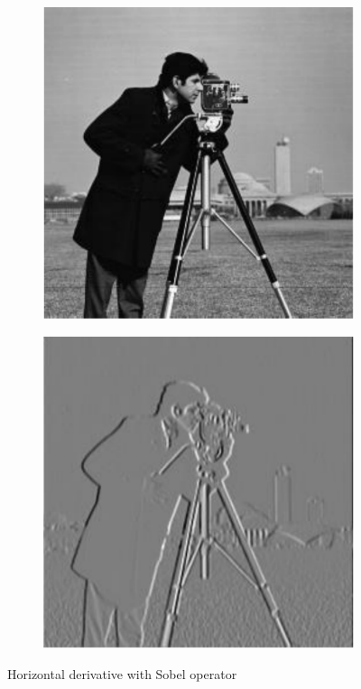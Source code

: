 \documentclass[../main.tex]{subfiles}
\begin{document}
\begin{figure}[h!]
    \centering
    \begin{subfigure}[]{0.35\linewidth}
        \label{fig:CameramanSub}
        \includegraphics[width=\linewidth]{images/Cameraman.png}
    \end{subfigure}
    \hspace{1cm}
    \begin{subfigure}[]{.35\linewidth}
        \label{fig:CameramanDx}
        \includegraphics[width=\linewidth]{images/CameramanDx.png}
    \end{subfigure}
    \caption{Horizontal derivative with Sobel operator}
    \label{fig:Cameraman}
\end{figure}
\end{document}
